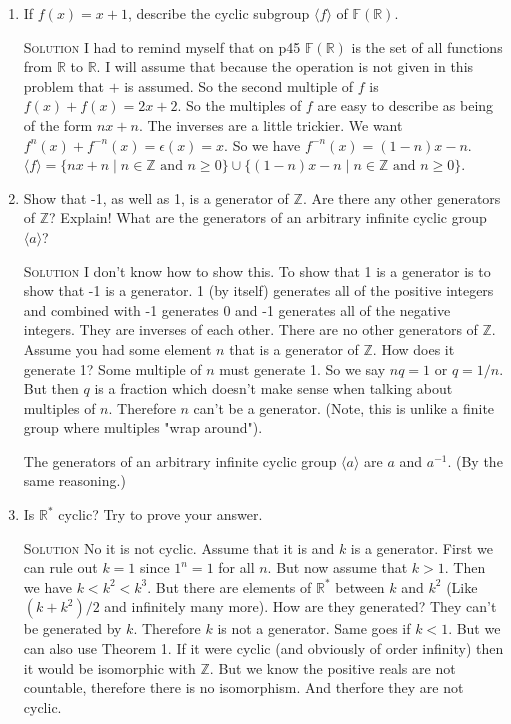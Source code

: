 \documentclass[twoside]{amsart}
\newcommand{\Reals}{\ensuremath{\mathbb{R}}\xspace}
\newcommand{\Integers}{\ensuremath{\mathbb{Z}{}}\xspace}
\newcommand{\solution}{\textsc{Solution}\xspace}
\newcommand{\blank}{\vspace{5pt}}
\newcommand{\ind}{\hspace{.35in}}
\newcommand{\itm}{\blank\item}
\newcommand{\sol}{\blank\noindent\solution}
\begin{document}
\begin{enumerate}[A.]
\begin{enumerate}[1)]
      \sol $\langle f \rangle = \{ f(x) = x + n \mid n \in \Integers \}$.

      \itm If $f(x) = x + 1$, describe the cyclic subgroup $\langle f
      \rangle$ of $\mathbb{F}(\Reals)$.

      \sol I had to remind myself that on p45 $\mathbb{F}(\Reals)$ is 
      the set of all functions from $\Reals$ to $\Reals$. I will assume that
      because the operation is not given in this problem that $+$ is assumed.
      So the second multiple of $f$ is $f(x) + f(x) = 2x + 2$.  So
      the multiples of $f$ are easy to describe as being of the
      form $nx + n$. The inverses are a little trickier. We want 
      $f^n(x) + f^{-n}(x) = \epsilon(x) = x$. So we have 
      $f^{-n}(x) = (1-n)x - n $.
      $\langle f \rangle = \{ nx + n \mid n \in \Integers \text{ and } n \ge
      0\} \cup \{(1-n)x - n \mid n \in \Integers \text{ and } n \ge 0\}$.

      \itm Show that -1, as well as 1, is a generator of $\Integers$. Are there
      any other generators of $\Integers$? Explain! What are the generators
      of an arbitrary infinite cyclic group $\langle a \rangle$?

      \sol I don't know how to show this. To show that 1 is a generator is
      to show that -1 is a generator. 1 (by itself) generates all of the
      positive integers and combined with -1 generates 0 and -1 generates
      all of the negative integers. They are inverses of each other.
      There are no other generators of $\Integers$. Assume you had some
      element $n$ that is a generator of $\Integers$. How does it
      generate 1? Some multiple of $n$ must generate 1. So we say
      $nq = 1$ or $q = 1/n$. But then $q$ is a fraction which doesn't make
      sense when talking about multiples of $n$. Therefore $n$ can't
      be a generator. (Note, this is unlike a finite group where 
      multiples "wrap around").
      
      \ind The generators of an arbitrary infinite cyclic group $\langle a
      \rangle$ are $a$ and $a^{-1}$. (By the same reasoning.)

      \itm Is $\Reals^*$ cyclic? Try to prove your answer.

      \sol No it is not cyclic. Assume that it is and $k$ is a generator. First
      we can rule out $k=1$ since $1^n = 1$ for all $n$. But now assume that $k
      > 1$.  Then we have $k < k^2 < k^3$. But there are elements of $\Reals^*$
      between $k$ and $k^2$ (Like $(k + k^2)/2$ and infinitely many more).  How
      are they generated?  They can't be generated by $k$. Therefore $k$
      is not a generator. Same goes if $k< 1$. But we can also use Theorem 1.
      If it were cyclic (and obviously of order infinity) then it would
      be isomorphic with $\Integers$. But we know the positive reals are not
      countable, therefore there is no isomorphism. And therfore they 
      are not cyclic.
   \end{enumerate}


\end{enumerate}
\end{document}
